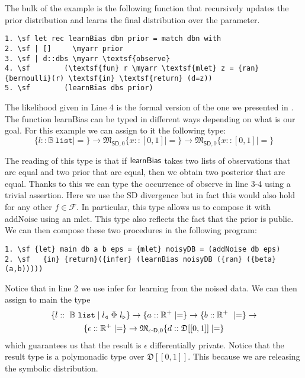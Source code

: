 \documentclass{sig-alternate-05-2015}
\theoremstyle{plain}
\theoremstyle{definition}
\theoremstyle{corollary}
\def\kwlist{\mathtt{list}}
\newcommand{\stbool}[0]{\mathbb{B}}
\newcommand{\stlist}[1]{{#1}\ \kwlist}
\def\lvmark{\triangleleft}
\def\rvmark{\triangleright}
\renewcommand{\l}[1]{#1_\lvmark}
\renewcommand{\r}[1]{#1_\rvmark}
\def\R{\mathbb{R}}
\newcommand{\rplus}{\R^+}
\newcommand{\fdiv}{\ensuremath{f}}
\begin{document}
The bulk of the example is the following function that recursively
updates the prior distribution and learns the final distribution over
the parameter. 
\begin{Verbatim}[commandchars=\\\{\}]
1. \sf let rec learnBias dbn prior = match dbn with
2. \sf | []     \myarr prior
3. \sf | d::dbs \myarr \textsf{observe} 
4. \sf        (\textsf{fun} r \myarr \textsf{mlet} z = {ran} {bernoulli}(r) \textsf{in} \textsf{return} (d=z))
5. \sf        (learnBias dbs prior)
\end{Verbatim}
The likelihood given in Line 4 is the formal version of the one we presented in .
The function {\sf learnBias} can be typed in different ways depending on what is our goal. For this example we can assign to it the following type:
$$
\{l::\stlist{\stbool} \mid = \}\rightarrow
\mathfrak{M}_{\mathsf{SD},0}\{x:: [0,1] \mid =\}\rightarrow
\mathfrak{M}_{\mathsf{SD},0}\{x:: [0,1] \mid = \}
$$

The reading of this type is that if ${\sf learnBias}$ takes two lists
of observations that are equal and two prior that are equal, then we
obtain two posterior that are equal. Thanks to this we can type the occurrence
of {\sf observe} in line 3-4 using a trivial assertion. Here we use the {\sf SD} divergence but in fact this would also hold for any other $\fdiv\in\mathcal{F}$. In particular, this type allows us to compose it with {\sf addNoise} using an {\sf mlet}. This type also reflects the fact that the prior is public.
We can then compose these two procedures in the following program:
\begin{Verbatim}[commandchars=\\\{\}]
1. \sf {let} main db a b eps = {mlet} noisyDB = (addNoise db eps) 
2. \sf   {in} {return}({infer} (learnBias noisyDB ({ran} ({beta}(a,b)))))
\end{Verbatim}
Notice that in line 2 we use {\sf infer} for learning from the noised data. 
We can then assign to {\sf main} the type 
\begin{multline*}
\{l::\ \stlist{\stbool} \mid \l{l}\ \Phi\ \r{l}\}\rightarrow\{a::\rplus \mid =
\}\rightarrow \{b::\rplus\ \mid = \}\rightarrow\\
\{\epsilon:: \rplus \mid = \}\rightarrow
\mathfrak{M}_{\epsilon\textnormal{-}\mathsf{D},0}\{d:: \mathfrak{D} [[0,1]] \mid = \}
\end{multline*}
which guarantees us that the result is $\epsilon$ differentially private. Notice that the result type is a polymonadic type over $\mathfrak{D} [[0,1]]$. This because we are releasing the symbolic distribution.
\end{document}
